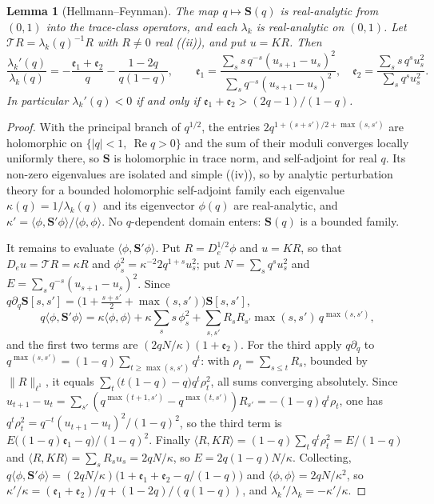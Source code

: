 \documentclass[11pt]{article}
\theoremstyle{plain}
\newtheorem{lemma}[theorem]{Lemma}
\theoremstyle{definition}
\theoremstyle{remark}
\renewcommand{\Re}{\operatorname{Re}}
\begin{document}
\begin{lemma}[Hellmann--Feynman]\label{lem:HF}
The map $q\mapsto\mathbf S(q)$ is real-analytic from $(0,1)$ into the trace-class operators, and
each $\lambda_k$ is real-analytic on $(0,1)$. Let $\mathcal TR=\lambda_k(q)^{-1}R$ with $R\ne0$ real
({\cite[Theorem ``the travel determinant'', \textup{thm:fredholm}]{Bonfioli2026bA}}\textup{(ii)}), and put $u=KR$. Then
\[
   \frac{\lambda_k'(q)}{\lambda_k(q)}=-\frac{\mathfrak e_1+\mathfrak e_2}{q}-\frac{1-2q}{q(1-q)},
   \qquad
   \mathfrak e_1=\frac{\sum_ss\,q^{-s}(u_{s+1}-u_s)^2}{\sum_sq^{-s}(u_{s+1}-u_s)^2},\quad
   \mathfrak e_2=\frac{\sum_ss\,q^su_s^2}{\sum_sq^su_s^2} .
\]
In particular $\lambda_k'(q)<0$ if and only if $\mathfrak e_1+\mathfrak e_2>(2q-1)/(1-q)$.
\end{lemma}

\begin{proof}
With the principal branch of $q^{1/2}$, the entries $2q^{1+(s+s')/2+\max(s,s')}$ are holomorphic
on $\{|q|<1,\ \Re q>0\}$ and the sum of their moduli converges locally uniformly there, so
$\mathbf S$ is holomorphic in trace norm, and self-adjoint for real $q$. Its non-zero eigenvalues are
isolated and simple ({\cite[Theorem ``the travel determinant'', \textup{thm:fredholm}]{Bonfioli2026bA}}\textup{(iv)}), so by analytic perturbation theory for
a bounded holomorphic self-adjoint family \cite[Ch.~II and Ch.~VII]{Kato} each eigenvalue
$\kappa(q)=1/\lambda_k(q)$ and its eigenvector $\phi(q)$ are real-analytic, and
$\kappa'=\langle\phi,\mathbf S'\phi\rangle/\langle\phi,\phi\rangle$. No $q$-dependent domain
enters: $\mathbf S(q)$ is a bounded family.

It remains to evaluate $\langle\phi,\mathbf S'\phi\rangle$. Put $R=D_e^{1/2}\phi$ and $u=KR$, so
that $D_eu=\mathcal TR=\kappa R$ and $\phi_s^2=\kappa^{-2}2q^{1+s}u_s^2$; put
$N=\sum_sq^su_s^2$ and $E=\sum_sq^{-s}(u_{s+1}-u_s)^2$. Since
$q\partial_q\mathbf S[s,s']=\bigl(1+\tfrac{s+s'}2+\max(s,s')\bigr)\mathbf S[s,s']$,
\[
   q\langle\phi,\mathbf S'\phi\rangle=\kappa\langle\phi,\phi\rangle+\kappa\sum_ss\,\phi_s^2
   +\sum_{s,s'}R_sR_{s'}\max(s,s')\,q^{\max(s,s')},
\]
and the first two terms are $(2qN/\kappa)(1+\mathfrak e_2)$. For the third apply $q\partial_q$ to
$q^{\max(s,s')}=(1-q)\sum_{t\ge\max(s,s')}q^t$: with $\rho_t=\sum_{s\le t}R_s$, bounded by
$\|R\|_{\ell^1}$, it equals $\sum_t\bigl(t(1-q)-q\bigr)q^t\rho_t^2$, all sums converging absolutely.
Since $u_{t+1}-u_t=\sum_{s'}(q^{\max(t+1,s')}-q^{\max(t,s')})R_{s'}=-(1-q)q^t\rho_t$, one has
$q^t\rho_t^2=q^{-t}(u_{t+1}-u_t)^2/(1-q)^2$, so the third term is
$E\bigl((1-q)\mathfrak e_1-q\bigr)/(1-q)^2$. Finally $\langle R,KR\rangle=(1-q)\sum_tq^t\rho_t^2
=E/(1-q)$ and $\langle R,KR\rangle=\sum_sR_su_s=2qN/\kappa$, so $E=2q(1-q)N/\kappa$. Collecting,
$q\langle\phi,\mathbf S'\phi\rangle=(2qN/\kappa)\bigl(1+\mathfrak e_1+\mathfrak e_2-q/(1-q)\bigr)$
and $\langle\phi,\phi\rangle=2qN/\kappa^2$, so
$\kappa'/\kappa=(\mathfrak e_1+\mathfrak e_2)/q+(1-2q)/(q(1-q))$, and
$\lambda_k'/\lambda_k=-\kappa'/\kappa$.
\end{proof}
\end{document}

